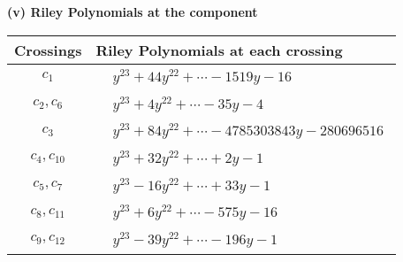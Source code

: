 \documentclass[1p]{elsarticle_modified}
\theoremstyle{definition}
\begin{document}
\flushleft \textbf{(v) Riley Polynomials at the component}\newline \\
\begin{tabular}{m{50pt}|m{274pt}}
Crossings & \hspace{64pt}Riley Polynomials at each crossing \\
\hline $$\begin{aligned}c_{1}\end{aligned}$$&$\begin{aligned}
&y^{23}+44 y^{22}+\cdots-1519 y-16
\end{aligned}$\\
\hline $$\begin{aligned}c_{2},c_{6}\end{aligned}$$&$\begin{aligned}
&y^{23}+4 y^{22}+\cdots-35 y-4
\end{aligned}$\\
\hline $$\begin{aligned}c_{3}\end{aligned}$$&$\begin{aligned}
&y^{23}+84 y^{22}+\cdots-4785303843 y-280696516
\end{aligned}$\\
\hline $$\begin{aligned}c_{4},c_{10}\end{aligned}$$&$\begin{aligned}
&y^{23}+32 y^{22}+\cdots+2 y-1
\end{aligned}$\\
\hline $$\begin{aligned}c_{5},c_{7}\end{aligned}$$&$\begin{aligned}
&y^{23}-16 y^{22}+\cdots+33 y-1
\end{aligned}$\\
\hline $$\begin{aligned}c_{8},c_{11}\end{aligned}$$&$\begin{aligned}
&y^{23}+6 y^{22}+\cdots-575 y-16
\end{aligned}$\\
\hline $$\begin{aligned}c_{9},c_{12}\end{aligned}$$&$\begin{aligned}
&y^{23}-39 y^{22}+\cdots-196 y-1
\end{aligned}$\\
\hline
\end{tabular}\\~\\
\end{document}
